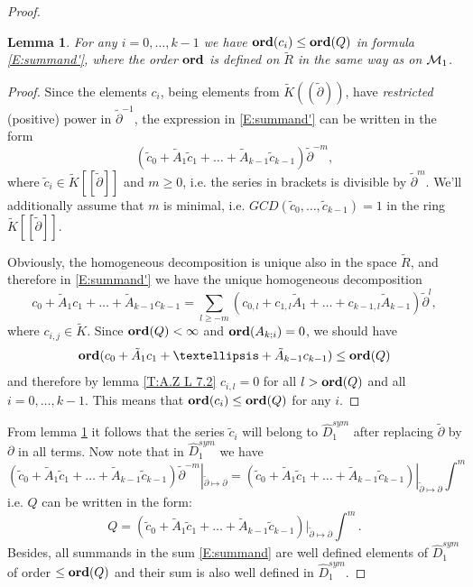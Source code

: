 \documentclass[11pt]{article}
\theoremstyle{definition}
\newcommand{\Ord}{\mathop {\rm \bf ord}}
\theoremstyle{plain}
\newtheorem{lemma}{Lemma}[section]
\numberwithin{equation}{section}
\newcommand{\cm}{{{\cal M}}}
\begin{document}
\begin{proof}
\begin{lemma}
\label{L:various_decompositions}
For any $i=0, \ldots , k-1$ we have $\Ord (c_{i})\le \Ord (Q)$ in formula \eqref{E:summand'}, where the order $\Ord$ is defined on $\tilde{R}$ in the same way as on $\cm_1$.
\end{lemma}

\begin{proof}
Since the elements $c_{i}$, { being elements from $\tilde{K}((\tilde{\partial}))$, have {\it restricted} (positive) power in $\tilde{\partial}^{-1}$}, the expression in \eqref{E:summand'} can be written in the form
$$
(\tilde{c}_0+\tilde{A}_1\tilde{c}_1+\ldots + \tilde{A}_{k-1}\tilde{c}_{k-1})\tilde{\partial}^{-m},
$$
where $\tilde{c}_i\in \tilde{K}[[\tilde{\partial}]]$ and $m\ge 0$, i.e. the series in brackets is divisible by  $\tilde{\partial}^{m}$. We'll additionally assume that $m$ is minimal, i.e. $GCD(\tilde{c}_0, \ldots , \tilde{c}_{k-1})=1$ in the ring $\tilde{K}[[\tilde{\partial}]]$. 

Obviously, the homogeneous decomposition is unique also in the space $\tilde{R}$, and therefore in \eqref{E:summand'} we have the unique homogeneous decomposition 
$$
c_0+\tilde{A}_1c_1+\ldots + \tilde{A}_{k-1}c_{k-1}=\sum_{l\ge -m}(c_{0,l}+c_{1,l}\tilde{A}_1+\ldots + c_{k-1,l}\tilde{A}_{k-1})\tilde{\partial}^l,
$$
where $c_{i,j}\in \tilde{K}$. Since $\Ord (Q) <\infty$ and $\Ord (A_{k; i})=0$, we should have 
$$
\Ord (c_0+\tilde{A}_1c_1+\ldots + \tilde{A}_{k-1}c_{k-1}) \le \Ord (Q)
$$
and therefore by lemma \ref{T:A.Z L 7.2} $c_{i,l}=0$ for all $l> \Ord (Q)$ and all $i=0,\ldots ,k-1$. This means that $\Ord (c_i)\le \Ord (Q)$ for any $i$. 
\end{proof}

From lemma \ref{L:various_decompositions} it follows that the series $\tilde{c}_{i}$ will belong to $\hat{D}_1^{sym}$ after replacing $\tilde{\partial}$ by $\partial$ in all terms. Now note that in $\hat{D}_1^{sym}$ we have 
$$
(\tilde{c}_0+\tilde{A}_1\tilde{c}_1+\ldots + \tilde{A}_{k-1}\tilde{c}_{k-1})\tilde{\partial}^{-m}|_{\tilde{\partial}\mapsto \partial}=
(\tilde{c}_0+\tilde{A}_1\tilde{c}_1+\ldots + \tilde{A}_{k-1}\tilde{c}_{k-1})|_{\tilde{\partial}\mapsto \partial}\int^{m}
$$
i.e. $Q$ can be written in the form:
\begin{equation}
\label{E:summand}
Q=(\tilde{c}_0+\tilde{A}_1\tilde{c}_1+\ldots + \tilde{A}_{k-1}\tilde{c}_{k-1})|_{\tilde{\partial}\mapsto \partial}\int^{m}.
\end{equation}
Besides, all summands in the sum \eqref{E:summand} are well defined elements of $\hat{D}_1^{sym}$ of order $\le \Ord (Q)$ and their sum is also well defined in $\hat{D}_1^{sym}$. 


\end{proof}
\end{document}
